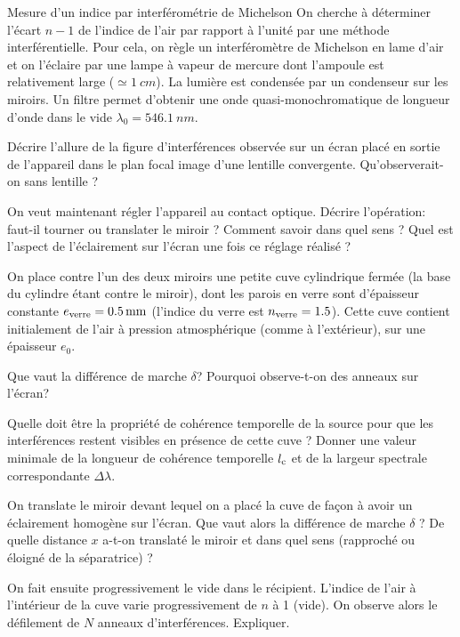 \begin{exo}[PC]{Mesure d'un indice par interférométrie de Michelson}
On cherche à déterminer l'écart $n-1$ de l'indice de l'air par rapport à l'unité par une méthode interférentielle. Pour cela, on règle un interféromètre de Michelson en lame d'air et on l'éclaire par une lampe à vapeur de mercure dont l'ampoule est relativement large ($\simeq\SI{1}{cm}$). La lumière est condensée par un condenseur sur les miroirs. Un filtre permet d'obtenir une onde quasi-monochromatique de longueur d'onde dans le vide $\lambda_0=\SI{546.1}{nm}$.
\begin{quest}
\item Décrire l'allure de la figure d'interférences observée sur un écran placé en sortie de l'appareil dans le plan focal image d'une lentille convergente. Qu'observerait-on sans lentille ?
\item On veut maintenant régler l'appareil au contact optique. Décrire l'opération: faut-il tourner ou translater le miroir ? Comment savoir dans quel sens ? Quel est l'aspect de l'éclairement sur l'écran une fois ce réglage réalisé ?
\item On place contre l'un des deux miroirs une petite cuve cylindrique fermée (la base du cylindre étant contre le miroir), dont les parois en verre sont d'épaisseur constante $e_{\rm{verre}}=\SI{0.5}{mm}$ (l'indice du verre est $n_{\rm{verre}}=1.5$). Cette cuve contient initialement de l'air à pression atmosphérique (comme à l'extérieur), sur une épaisseur $e_{0}$.
\begin{quest}
\item Que vaut la différence de marche $\delta$? Pourquoi observe-t-on des anneaux sur l'écran?
\item Quelle doit être la propriété de cohérence temporelle de la source pour que les interférences restent visibles en présence de cette cuve ? Donner une valeur minimale de la longueur de cohérence temporelle $l_{\rm{c}}$ et de la largeur spectrale correspondante $\Delta\lambda$.
\end{quest}
\item On translate le miroir devant lequel on a placé la cuve de façon à avoir un éclairement homogène sur l'écran. Que vaut alors la différence de marche $\delta$ ? De quelle distance $x$ a-t-on translaté le miroir et dans quel sens (rapproché ou éloigné de la séparatrice) ?
\item On fait ensuite progressivement le vide dans le récipient. L'indice de l'air à l'intérieur de la cuve varie progressivement de $n$ à 1 (vide). On observe alors le défilement de $N$ anneaux d'interférences. Expliquer.

\end{quest}
\end{exo}
